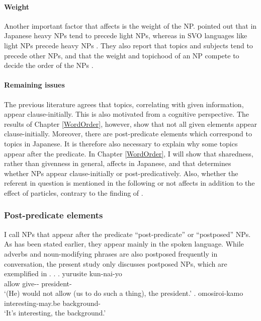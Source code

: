 \paragraph{Weight}
\hspace*{-1.5mm}Another important factor that affects  is the weight of the NP.
 pointed out that
in Japanese
heavy NPs tend to precede light NPs,
whereas in SVO languages like 
light NPs precede heavy NPs \cite[e.g.,][]{arnoldetal00}.
They also report that topics and subjects tend to precede other NPs,
and that the weight and topichood of an NP compete to decide the order of the NPs \cite[see also][]{kondoyamashita07}.


\paragraph{Remaining issues}

The previous literature agrees that topics,
correlating with given information, appear clause-initially.
This is also motivated from a cognitive perspective.
The results of Chapter \ref{WordOrder}, however, show that
not all given elements appear clause-initially.
Moreover, there are post-predicate elements which correspond to topics in Japanese.
It is therefore also necessary to explain why some topics appear after the predicate.
In Chapter \ref{WordOrder},
I will show that sharedness,
rather than givenness in general,
affects  in Japanese, and that
 determines whether
NPs appear clause-initially or post-predicatively.
Also, whether the referent in question is mentioned in the following  or not affects  in addition to the effect of particles,
contrary to the finding of .

\subsubsection{Post-predicate elements}\label{Back:CharJ:WO:PostP}

I call NPs that appear after the predicate ``post-predicate'' or ``postposed'' NPs.
As has been stated earlier,
they appear mainly in the spoken language.
While adverbs and noun-modifying phrases are also postposed frequently in conversation,
the present study only discusses postposed NPs,
which are exemplified in \Next.
%
\ex.
 \ag. yurusite kun-nai-yo  \\
      allow give-- president- \\
      `(He) would not allow (us to do such a thing), the president.'
      \hfill{\cite[431]{onosuzuki92}}
 \bg. omosiroi-kamo  \\
      interesting-may.be background- \\
      `It's interesting, the background.'
      \hfill{\cite[9]{nakagawaetal08_paper}}


